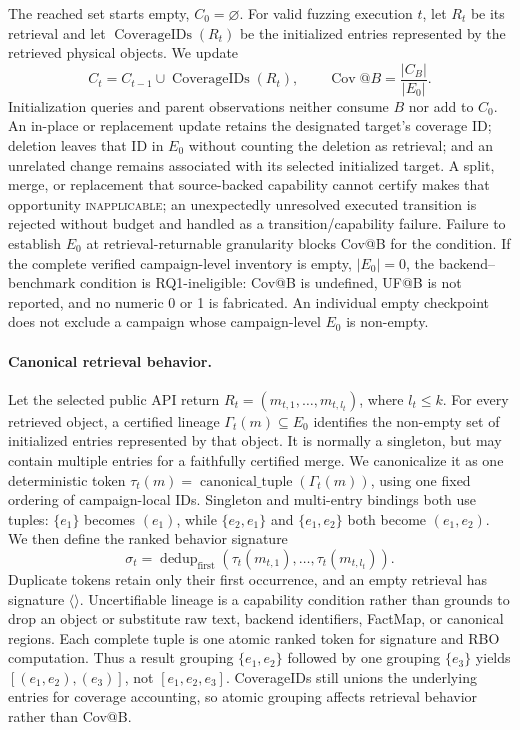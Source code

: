 The reached set starts empty, \(C_0=\varnothing\). For valid fuzzing execution
\(t\), let \(R_t\) be its retrieval and let
\(\operatorname{CoverageIDs}(R_t)\) be the initialized entries represented by
the retrieved physical objects. We update
\begin{equation}
C_t=C_{t-1}\cup\operatorname{CoverageIDs}(R_t),
\qquad
\operatorname{Cov}@B=\frac{|C_B|}{|E_0|}.
\label{eq:entry-coverage}
\end{equation}
Initialization queries and parent observations neither consume \(B\) nor add
to \(C_0\). An in-place or replacement update retains the designated target's
coverage ID; deletion leaves that ID in \(E_0\) without counting the deletion
as retrieval; and an unrelated change remains associated with its selected
initialized target. A split, merge, or replacement that source-backed
capability cannot certify makes that opportunity \textsc{inapplicable}; an
unexpectedly unresolved executed transition is rejected without budget and
handled as a transition/capability failure. Failure to establish \(E_0\) at
retrieval-returnable granularity blocks Cov@B for the condition.
If the complete verified campaign-level inventory is empty, \(|E_0|=0\), the
backend--benchmark condition is RQ1-ineligible: Cov@B is undefined, UF@B is not
reported, and no numeric 0 or 1 is fabricated. An individual empty checkpoint
does not exclude a campaign whose campaign-level \(E_0\) is non-empty.

\paragraph{Canonical retrieval behavior.}
Let the selected public API return
\(R_t=(m_{t,1},\ldots,m_{t,l_t})\), where \(l_t\leq k\). For every
retrieved object, a certified lineage
\(\Gamma_t(m)\subseteq E_0\) identifies the non-empty set of initialized
entries represented by that object. It is normally a singleton, but may contain
multiple entries for a faithfully certified merge. We canonicalize it as one
deterministic token
\(\tau_t(m)=\operatorname{canonical\_tuple}(\Gamma_t(m))\), using one fixed
ordering of campaign-local IDs. Singleton and multi-entry bindings both use
tuples: \(\{e_1\}\) becomes \((e_1)\), while \(\{e_2,e_1\}\) and
\(\{e_1,e_2\}\) both become \((e_1,e_2)\). We then define the ranked behavior
signature
\begin{equation}
\sigma_t=\operatorname{dedup}_{\mathrm{first}}
  (\tau_t(m_{t,1}),\ldots,\tau_t(m_{t,l_t})).
\label{eq:retrieval-signature}
\end{equation}
Duplicate tokens retain only their first occurrence, and an empty retrieval
has signature \(\langle\rangle\). Uncertifiable lineage is a capability
condition rather than grounds to drop an object or substitute raw text,
backend identifiers, FactMap, or canonical regions.
Each complete tuple is one atomic ranked token for signature and RBO
computation. Thus a result grouping \(\{e_1,e_2\}\) followed by one grouping
\(\{e_3\}\) yields \([(e_1,e_2),(e_3)]\), not
\([e_1,e_2,e_3]\). CoverageIDs still unions the underlying entries for
coverage accounting, so atomic grouping affects retrieval behavior rather than
Cov@B.

